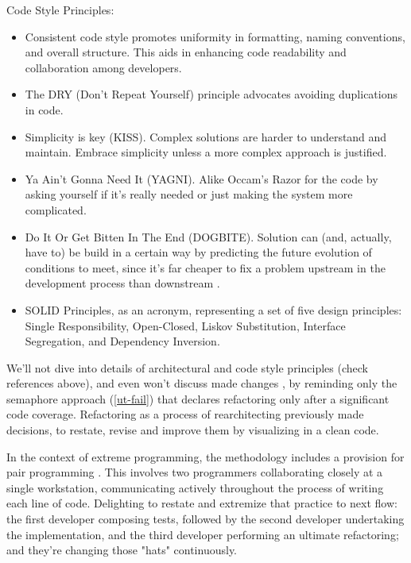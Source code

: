 \noindent Code Style Principles:

\begin{itemize}
  \item Consistent code style \cite{Mart22} promotes uniformity in formatting, naming conventions, and overall structure. 
  This aids in enhancing code readability and collaboration among developers.

  \item The DRY (Don't Repeat Yourself) principle advocates avoiding duplications in code.

  \item Simplicity is key (KISS). Complex solutions are harder to understand and maintain. Embrace simplicity unless a 
  more complex approach is justified.

  \item Ya Ain't Gonna Need It (YAGNI). Alike Occam's Razor for the code by asking yourself if it's really needed or 
  just making the system more complicated.

  \item Do It Or Get Bitten In The End (DOGBITE). Solution can (and, actually, have to) be build in a certain way 
  by predicting the future evolution of conditions to meet, since it's far cheaper to fix a problem upstream in the 
  development process than downstream \cite{McCo97}.

  \item SOLID Principles, as an acronym, representing a set of five design principles: Single Responsibility, 
  Open-Closed, Liskov Substitution, Interface Segregation, and Dependency Inversion.
\end{itemize}

\noindent We'll not dive into details of architectural and code style principles (check references above), and even 
won't discuss made changes , by reminding only the semaphore approach (\ref{ut-fail}) that declares 
refactoring only after a significant code coverage. Refactoring as a process of rearchitecting \cite{Chec23} previously
made decisions, to restate, revise and improve them by visualizing in a clean code. 

In the context of extreme programming, the methodology includes a provision for pair programming \cite{Ligu19}. This 
involves two programmers collaborating closely at a single workstation, communicating actively throughout the process 
of writing each line of code. Delighting to restate and extremize that practice to next flow: the first developer 
composing tests, followed by the second developer undertaking the implementation, and the third developer 
performing an ultimate refactoring; and they're changing those "hats" \cite{Bono17} continuously.
